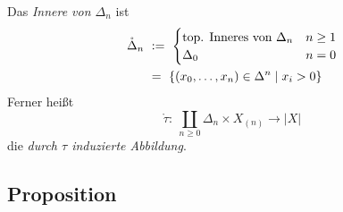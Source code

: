 \begin{definition}
  Das \emph{Innere von $\Delta_n$} ist 
  \begin{align*}
    \mathring\Delta_n \ &:=\  \begin{cases}
    \text{top. Inneres von } \Delta_n & n \geq 1 \\
    \Delta_0 & n =0
    \end{cases} \\
    \ &=\  \{ (x_0,\ldots, x_n) \in \Delta^n \mid x_i > 0\}
  \end{align*}
  Ferner heißt 
  \[ \mathring\tau:\ \coprod_{n\geq 0} \Delta_n \times X_{(n)} \to |X| \]
  die \emph{durch $\tau$ induzierte Abbildung}.
\end{definition}


\subsection{Proposition}

